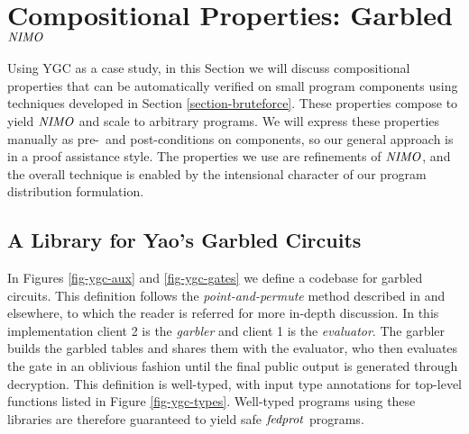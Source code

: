 \section{Compositional Properties: Garbled $\mathit{NIMO}$}
\label{section-composition}

Using YGC as a case study, in this Section we will discuss
compositional properties that can be automatically verified on small
program components using techniques developed in Section
\ref{section-bruteforce}. These properties compose to yield $\mathit{NIMO}$
and scale to arbitrary programs. We will express these properties
manually as pre-~and post-conditions on components, so our
general approach is in a proof assistance style. The properties
we use are refinements of $\mathit{NIMO}$, and the overall technique is
enabled by the intensional character of our program distribution
formulation.

\subsection{A Library for Yao's Garbled Circuits}
\label{section-metalang-ygc}



In Figures \ref{fig-ygc-aux} and \ref{fig-ygc-gates} we define a
codebase for garbled circuits. This definition follows the
\emph{point-and-permute} method described in \cite{XXX} and elsewhere,
to which the reader is referred for more in-depth discussion.
In this implementation client 2 is the \emph{garbler} and
client 1 is the \emph{evaluator}. The garbler builds the garbled
tables and shares them with the evaluator, who then evaluates
the gate in an oblivious fashion until the final public output is
generated through decryption. This definition is well-typed,
with input type annotations for top-level functions listed in
Figure \ref{fig-ygc-types}. Well-typed programs using these
libraries are therefore guaranteed to yield safe $\mathit{fedprot}$
programs. 

